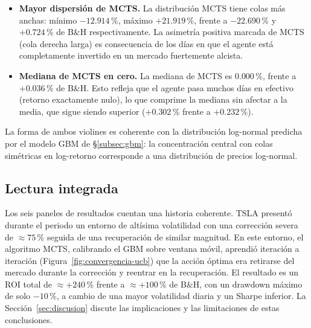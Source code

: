\begin{itemize}
    \item \textbf{Mayor dispersión de MCTS.} La distribución MCTS tiene colas más anchas: mínimo $-12{.}914\,\%$, máximo $+21{.}919\,\%$, frente a $-22{.}690\,\%$ y $+0{.}724\,\%$ de B\&H respectivamente. La asimetría positiva marcada de MCTS (cola derecha larga) es consecuencia de los días en que el agente está completamente invertido en un mercado fuertemente alcista.
    \item \textbf{Mediana de MCTS en cero.} La mediana de MCTS es $0{.}000\,\%$, frente a $+0{.}036\,\%$ de B\&H. Esto refleja que el agente pasa muchos días en efectivo (retorno exactamente nulo), lo que comprime la mediana sin afectar a la media, que sigue siendo superior ($+0{.}302\,\%$ frente a $+0{.}232\,\%$).
\end{itemize}

La forma de ambos violines es coherente con la distribución log-normal predicha por el modelo GBM de §\ref{subsec:gbm}: la concentración central con colas simétricas en log-retorno corresponde a una distribución de precios log-normal.

\subsection{Lectura integrada}
\label{subsec:lectura-integrada}

Los seis paneles de resultados cuentan una historia coherente. TSLA presentó durante el periodo un entorno de altísima volatilidad con una corrección severa de $\approx 75\,\%$ seguida de una recuperación de similar magnitud. En este entorno, el algoritmo MCTS, calibrando el GBM sobre ventana móvil, aprendió iteración a iteración (Figura~\ref{fig:convergencia-ucb}) que la acción óptima era retirarse del mercado durante la corrección y reentrar en la recuperación. El resultado es un ROI total de $\approx +240\,\%$ frente a $\approx +100\,\%$ de B\&H, con un drawdown máximo de solo $-10\,\%$, a cambio de una mayor volatilidad diaria y un Sharpe inferior. La Sección~\ref{sec:discusion} discute las implicaciones y las limitaciones de estas conclusiones.
